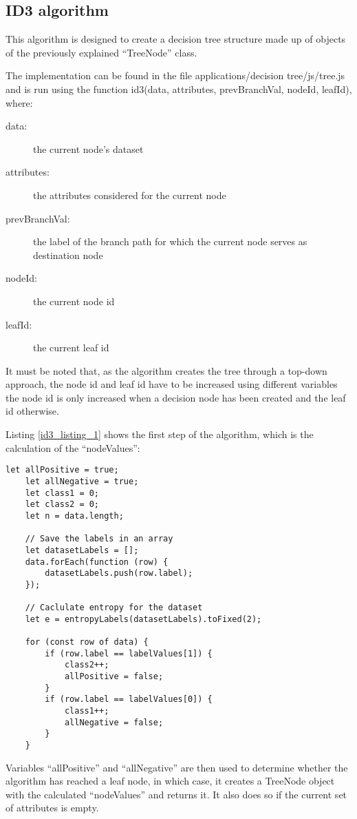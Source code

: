 \subsection{ID3 algorithm}
This algorithm is designed to create a decision tree structure made up of objects of the previously explained ``TreeNode'' class. 

The implementation can be found in the file applications/decision tree/js/tree.js and is run using the function id3(data, attributes, prevBranchVal, nodeId, leafId), where:
\begin{description}
    \item[data:] the current node's dataset
    \item[attributes:] the attributes considered for the current node
    \item[prevBranchVal:] the label of the branch path for which the current node serves as destination node
    \item[nodeId:] the current node id
    \item[leafId:] the current leaf id 
\end{description}
It must be noted that, as the algorithm creates the tree through a top-down approach, the node id and leaf id have to be increased using different variables the node id is only increased when a decision node has been created and the leaf id otherwise.

Listing \ref{id3_listing_1} shows the first step of the algorithm, which is the calculation of the ``nodeValues'':
\begin{lstlisting}[caption=Calculation of ``nodeValues'']
    let allPositive = true;
    let allNegative = true;
    let class1 = 0;
    let class2 = 0;
    let n = data.length;

    // Save the labels in an array
    let datasetLabels = [];
    data.forEach(function (row) {
        datasetLabels.push(row.label);
    });

    // Caclulate entropy for the dataset
    let e = entropyLabels(datasetLabels).toFixed(2);

    for (const row of data) {
        if (row.label == labelValues[1]) {
            class2++;
            allPositive = false;
        }
        if (row.label == labelValues[0]) {
            class1++;
            allNegative = false;
        }
    }
\end{lstlisting} \label{id3_listing_1}

Variables ``allPositive'' and ``allNegative'' are then used to determine whether the algorithm has reached a leaf node, in which case, it creates a TreeNode object with the calculated ``nodeValues'' and returns it. It also does so if the current set of attributes is empty.

